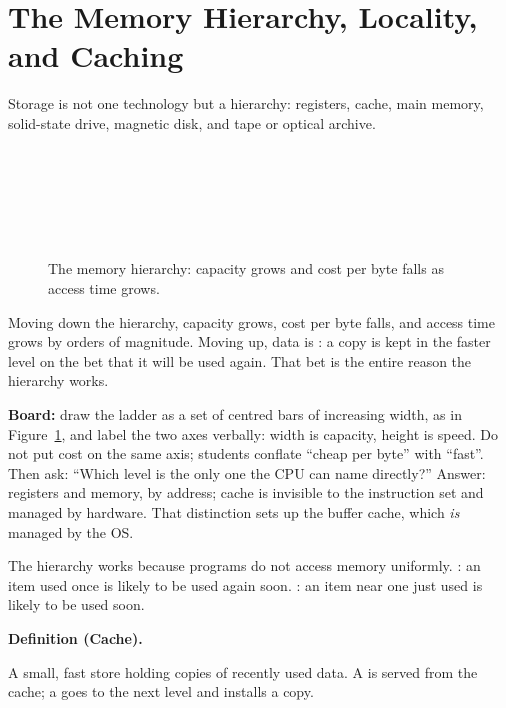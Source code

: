 \documentclass[11pt]{article}
\newenvironment{definitionbox}[1]{%
  \par\noindent\textbf{Definition (#1).}\ \itshape
}{\par\vspace{0.3em}}
\begin{document}
\section{The Memory Hierarchy, Locality, and Caching}

Storage is not one technology but a hierarchy: registers, cache, main memory,
solid-state drive, magnetic disk, and tape or optical archive.

\begin{figure}[ht]
\centering
\small
{}\\[0.15em]
\\[0.15em]
\\[0.15em]
\\[0.15em]
\\[0.15em]
\caption{The memory hierarchy: capacity grows and cost per byte falls as access
time grows.}
\label{fig:hierarchy}
\end{figure}

Moving down the hierarchy, capacity grows, cost per byte falls, and access time
grows by orders of magnitude. Moving up, data is : a copy is kept in
the faster level on the bet that it will be used again. That bet is the entire
reason the hierarchy works.

\textbf{Board:} draw the ladder as a set of centred bars of increasing width, as
in Figure~\ref{fig:hierarchy}, and label the two axes verbally: width is
capacity, height is speed. Do not put cost on the same axis; students conflate
``cheap per byte'' with ``fast''. Then ask: ``Which level is the only one the CPU
can name directly?'' Answer: registers and memory, by address; cache is invisible
to the instruction set and managed by hardware. That distinction sets up the
buffer cache, which \emph{is} managed by the OS.

The hierarchy works because programs do not access memory uniformly.
: an item used once is likely to be used again soon.
: an item near one just used is likely to be used soon.

\begin{definitionbox}{Cache}
A small, fast store holding copies of recently used data. A  is served
from the cache; a  goes to the next level and installs a copy.
\end{definitionbox}
\end{document}
